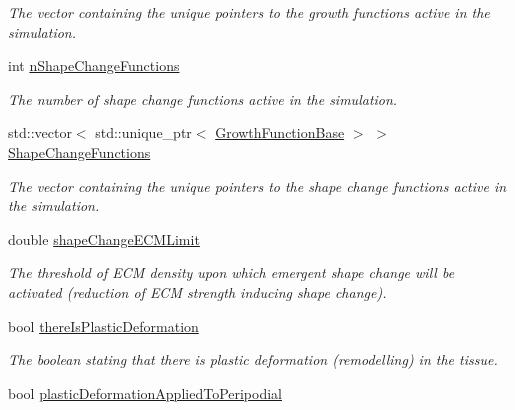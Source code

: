 \begin{DoxyCompactItemize}
\begin{DoxyCompactList}\small\item\em The vector containing the unique pointers to the growth functions active in the simulation. \end{DoxyCompactList}\item 
\hypertarget{classSimulation_a74251252e9f320268055537749d674c1}{}int \hyperlink{classSimulation_a74251252e9f320268055537749d674c1}{n\+Shape\+Change\+Functions}\label{classSimulation_a74251252e9f320268055537749d674c1}

\begin{DoxyCompactList}\small\item\em The number of shape change functions active in the simulation. \end{DoxyCompactList}\item 
\hypertarget{classSimulation_afdceee7efa90cc90973292c5e0a72e72}{}std\+::vector$<$ std\+::unique\+\_\+ptr$<$ \hyperlink{classGrowthFunctionBase}{Growth\+Function\+Base} $>$ $>$ \hyperlink{classSimulation_afdceee7efa90cc90973292c5e0a72e72}{Shape\+Change\+Functions}\label{classSimulation_afdceee7efa90cc90973292c5e0a72e72}

\begin{DoxyCompactList}\small\item\em The vector containing the unique pointers to the shape change functions active in the simulation. \end{DoxyCompactList}\item 
\hypertarget{classSimulation_a5869e105b5d4d2e41c071f24988b314e}{}double \hyperlink{classSimulation_a5869e105b5d4d2e41c071f24988b314e}{shape\+Change\+E\+C\+M\+Limit}\label{classSimulation_a5869e105b5d4d2e41c071f24988b314e}

\begin{DoxyCompactList}\small\item\em The threshold of E\+C\+M density upon which emergent shape change will be activated (reduction of E\+C\+M strength inducing shape change). \end{DoxyCompactList}\item 
\hypertarget{classSimulation_ab0d54e9e505f3701cf5ca8b0ac0df00a}{}bool \hyperlink{classSimulation_ab0d54e9e505f3701cf5ca8b0ac0df00a}{there\+Is\+Plastic\+Deformation}\label{classSimulation_ab0d54e9e505f3701cf5ca8b0ac0df00a}

\begin{DoxyCompactList}\small\item\em The boolean stating that there is plastic deformation (remodelling) in the tissue. \end{DoxyCompactList}\item 
\hypertarget{classSimulation_abf2cb97bd129a14b21e15b742af8768c}{}bool \hyperlink{classSimulation_abf2cb97bd129a14b21e15b742af8768c}{plastic\+Deformation\+Applied\+To\+Peripodial}\label{classSimulation_abf2cb97bd129a14b21e15b742af8768c}


\end{DoxyCompactItemize}
